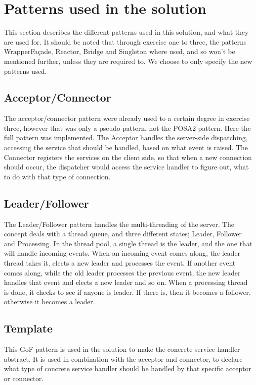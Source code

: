 \documentclass[Main]{subfiles}
\begin{document}
\section{Patterns used in the solution}\label{sec:patterns}
This section describes the different patterns used in this solution, and what they are used for. 
It should be noted that through exercise one to three, the patterns WrapperFaçade, Reactor, Bridge and Singleton where used, and so won't be mentioned further, unless they are required to. We choose to only specify the new patterns used.

\subsection{Acceptor/Connector}
The acceptor/connector pattern were already used to a certain degree in exercise three, however that was only a pseudo pattern, not the POSA2 pattern. 
Here the full pattern was implemented.
The Acceptor handles the server-side dispatching, accessing the service that should be handled, based on what event is raised.
The Connector registers the services on the client side, so that when a new connection should occur, the dispatcher would access the service handler to figure out, what to do with that type of connection.

\subsection*{Leader/Follower}
The Leader/Follower pattern handles the multi-threading of the server. The concept deals with a thread queue, and three different states; Leader, Follower and Processing. In the thread pool, a single thread is the leader, and the one that will handle incoming events. When an incoming event comes along, the leader thread takes it, elects a new leader and processes the event. If another event comes along, while the old leader processes the previous event, the new leader handles that event and elects a new leader and so on. When a processing thread is done, it checks to see if anyone is leader. If there is, then it becomes a follower, otherwise it becomes a leader.

\subsection*{Template}
This GoF pattern is used in the solution to make the concrete service handler abstract. It is used in combination with the acceptor and connector, to declare what type of concrete service handler should be handled by that specific acceptor or connector.
\end{document}
